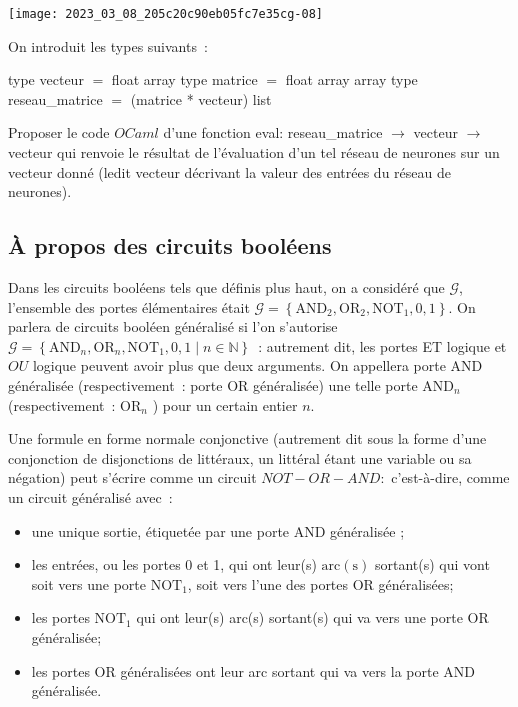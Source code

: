 \documentclass[10pt]{article}
\begin{document}
\begin{center}
\texttt{[image: 2023\_03\_08\_205c20c90eb05fc7e35cg-08]}
\end{center}

On introduit les types suivants :

type vecteur $=$ float array
type matrice $=$ float array array
type reseau\_matrice $=$ (matrice * vecteur) list

Proposer le code $O C a m l$ d'une fonction eval: reseau\_matrice $→$ vecteur $→$ vecteur qui renvoie le résultat de l'évaluation d'un tel réseau de neurones sur un vecteur donné (ledit vecteur décrivant la valeur des entrées du réseau de neurones).

\subsection{À propos des circuits booléens}
Dans les circuits booléens tels que définis plus haut, on a considéré que $\mathcal{G}$, l'ensemble des portes élémentaires était $\mathcal{G}=\left\{\mathrm{AND}_{2}, \mathrm{OR}_{2}, \mathrm{NOT}_{1}, 0,1\right\}$. On parlera de circuits booléen généralisé si l'on s'autorise $\mathcal{G}=\left\{\mathrm{AND}_{n}, \mathrm{OR}_{n}, \mathrm{NOT}_{1}, 0,1 \mid n \in \mathbb{N}\right\}$ : autrement dit, les portes ET logique et $O U$ logique peuvent avoir plus que deux arguments. On appellera porte AND généralisée (respectivement : porte OR généralisée) une telle porte $\mathrm{AND}_{n}$ (respectivement : $\mathrm{OR}_{n}$ ) pour un certain entier $n$.

Une formule en forme normale conjonctive (autrement dit sous la forme d'une conjonction de disjonctions de littéraux, un littéral étant une variable ou sa négation) peut s'écrire comme un circuit $N O T-O R-A N D:$ c'est-à-dire, comme un circuit généralisé avec :

\begin{itemize}
  \item une unique sortie, étiquetée par une porte AND généralisée ;

  \item les entrées, ou les portes 0 et 1, qui ont leur(s) $\mathrm{arc(s)}$ sortant(s) qui vont soit vers une porte $\mathrm{NOT}_{1}$, soit vers l'une des portes OR généralisées;

  \item les portes $\mathrm{NOT}_{1}$ qui ont leur(s) arc(s) sortant(s) qui va vers une porte OR généralisée;

  \item les portes OR généralisées ont leur arc sortant qui va vers la porte AND généralisée.

\end{itemize}
\end{document}
